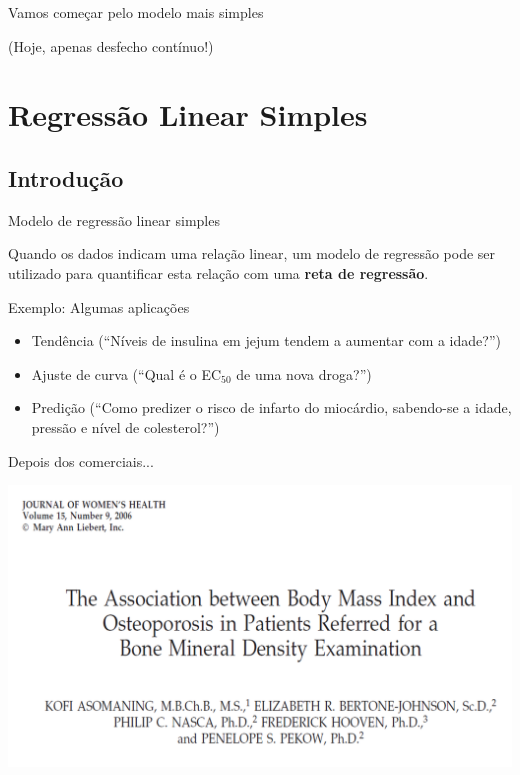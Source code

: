 \documentclass{beamer}
\begin{document}
\begin{frame}
  \begin{center}
    \Large Vamos começar pelo modelo mais simples
  \end{center}
  \vfill
  \hfill \footnotesize (Hoje, apenas desfecho contínuo!)
\end{frame}

\section[Regressão]{Regressão Linear Simples}

\subsection{Introdução}

\begin{frame}{Modelo de regressão linear simples}
  \begin{block}{}
    \small
      Quando os dados indicam uma relação linear, um modelo de regressão pode ser utilizado para quantificar esta relação com uma {\bf reta de regressão}.
    \end{block}
  \begin{exampleblock}{Exemplo: Algumas aplicações}

    \begin{itemize}
      \footnotesize
    \item Tendência (``Níveis de insulina em jejum tendem a aumentar com a idade?'')
    \item Ajuste de curva (``Qual é o EC$_{50}$ de uma nova droga?'')
    \item Predição (``Como predizer o risco de infarto do miocárdio, sabendo-se a idade, pressão e nível de colesterol?'')
    \end{itemize}
  \end{exampleblock}
\end{frame}

\begin{frame}{Depois dos comerciais...}
  \begin{center}
    \includegraphics[width=\textwidth]{Cap18-19/bmi-bmd-title}
  \end{center}
\end{frame}
\end{document}
